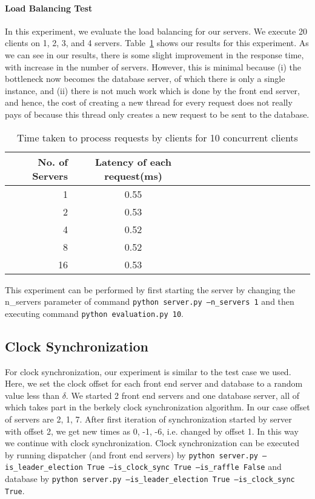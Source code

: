\documentclass{article}
\begin{document}
\paragraph{Load Balancing Test} In this experiment,
we evaluate the load balancing for our servers. We execute 20 clients on
1, 2, 3, and 4 servers.
Table~\ref{tab:load-balancing} shows our results for this experiment.
As we can see in our results, there is some slight improvement in the response
time, with increase in the number of servers. However, this is minimal 
because (i) the bottleneck now becomes the database server, of which there is only
a single instance, and (ii) there is not much work which is done by the front
end server, and hence, the cost of creating a new thread for every request
does not really pays of because this thread only creates a new request to be sent to the 
database.
\begin{table}
    \small
\begin{tabularx}{\linewidth}{rccccccccccccc}
\toprule
No. of Servers &Latency of each request(ms)\\
\midrule
1&0.55\\
2&0.53\\
4&0.52\\
8&0.52\\
16&0.53\\
\bottomrule
\end{tabularx}
\caption{Time taken to process requests by clients for 10 concurrent clients}
\label{tab:load-balancing}
\end{table}

This experiment can be performed by first starting the server by changing
the n\_servers parameter of command {\tt python server.py --n\_servers 1} and then 
executing command {\tt python evaluation.py 10}.
\subsection{Clock Synchronization}
For clock synchronization, our experiment is similar to the test case we used.
Here, we set the clock offset for each front end server and database to a 
random value less than $\delta$. We started 2 front end servers and one 
database server, all of which takes part in the berkely clock synchronization
algorithm. In our case offset of servers are 2, 1, 7. After first iteration 
of synchronization started by server with offset 2, we get new times as
0, -1, -6, i.e. changed by offset 1. In this way we continue with 
clock synchronization. Clock synchronization can be executed by
running dispatcher (and front end servers) by {\tt python server.py --is\_leader\_election True --is\_clock\_sync True --is\_raffle False}
and database by {\tt python server.py --is\_leader\_election True --is\_clock\_sync True}.
\end{document}
